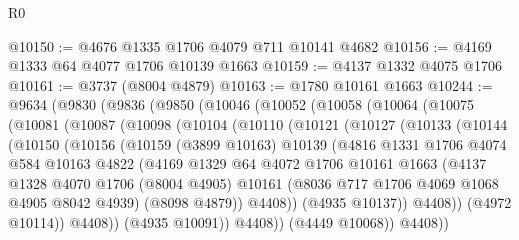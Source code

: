 \begin{lexlean}{R0}
\begin{coremodule}
@10150 := @4676 @1335 @1706 @4079 @711 @10141 @4682
@10156 := @4169 @1333 @64 @4077 @1706 @10139 @1663
@10159 := @4137 @1332 @4075 @1706
@10161 := @3737 (@8004 @4879)
@10163 := @1780 @10161 @1663
@10244 := @9634
    (@9830
      (@9836
        (@9850
          (@10046
            (@10052
              (@10058
                (@10064
                  (@10075
                    (@10081
                      (@10087
                        (@10098
                          (@10104
                            (@10110
                              (@10121
                                (@10127
                                  (@10133
                                    (@10144
                                      (@10150
                                        (@10156
                                          (@10159
                                            (@3899 @10163)
                                            @10139
                                            (@4816
                                              @1331
                                              @1706
                                              @4074
                                              @584
                                              @10163
                                              @4822
                                              (@4169
                                                @1329
                                                @64
                                                @4072
                                                @1706
                                                @10161
                                                @1663
                                                (@4137
                                                  @1328
                                                  @4070
                                                  @1706
                                                  (@8004 @4905)
                                                  @10161
                                                  (@8036 @717 @1706 @4069 @1068 @4905 @8042 @4939)
                                                  (@8098 @4879))
                                                @4408))
                                            (@4935 @10137))
                                          @4408))
                                      (@4972 @10114))
                                    @4408))
                                (@4935 @10091))
                              @4408))
                          (@4449 @10068))
                        @4408))

\end{coremodule}
\end{lexlean}
